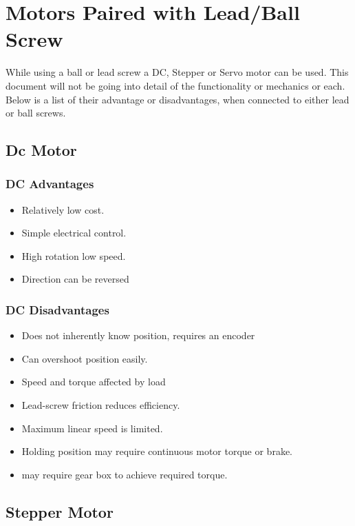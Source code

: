 \documentclass{article}
\begin{document}
\section{Motors Paired with Lead/Ball Screw }

While using a ball or lead screw a DC, Stepper or Servo motor can be used.
This document will not be going into detail of the functionality or mechanics or each.
Below is a list of their advantage or disadvantages, when connected to either lead or ball screws. 

\subsection{Dc Motor}
\subsubsection{ DC Advantages}

\begin{itemize}
    \item Relatively low cost.
    \item Simple electrical control.
    \item High rotation low speed.
    \item Direction can be reversed
\end{itemize}

\subsubsection{DC Disadvantages}

\begin{itemize}
    \item Does not inherently know position, requires an encoder
    \item Can overshoot position easily. 
    \item Speed and torque affected by load
    \item Lead-screw friction reduces efficiency.
    \item Maximum linear speed is limited.
    \item Holding position may require continuous motor torque or brake. 
    \item may require gear box to achieve required torque. 
\end{itemize}

\subsection{Stepper Motor}
\end{document}
